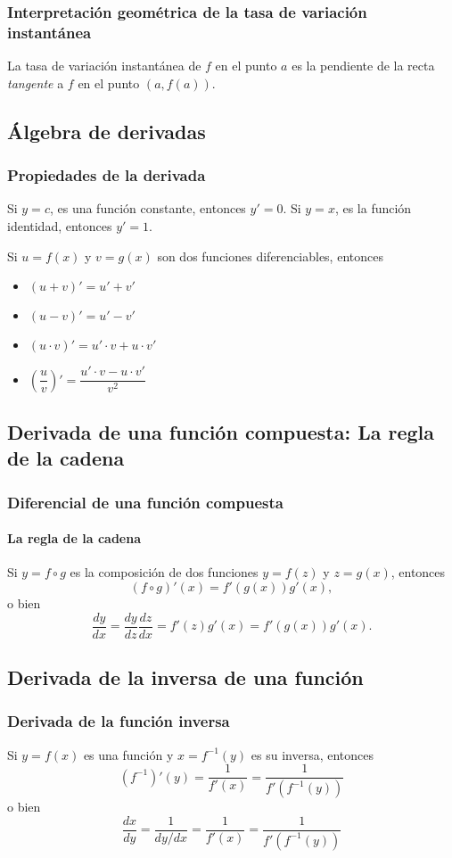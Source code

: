 \begin{frame}
\frametitle{Interpretación geométrica de la tasa de variación instantánea}
La tasa de variación instantánea de $f$ en el punto $a$ es la pendiente de la recta \emph{tangente} a $f$ en el punto $(a,f(a))$.
\begin{center}
\scalebox{1}{}
\end{center}
\end{frame}



\subsection{Álgebra de derivadas}
\begin{frame}
\frametitle{Propiedades de la derivada}
Si $y=c$, es una función constante, entonces $y'=0$.
Si $y=x$, es la función identidad, entonces  $y'=1$.

Si $u=f(x)$ y $v=g(x)$ son dos funciones diferenciables, entonces
\begin{itemize}
\item $(u+v)'=u'+v'$
\item $(u-v)'=u'-v'$
\item $(u\cdot v)'=u'\cdot v+ u\cdot v'$
\item $\left(\dfrac{u}{v}\right)'=\dfrac{u'\cdot v-u\cdot v'}{v^2}$
\end{itemize}
\end{frame}


\subsection{Derivada de una función compuesta: La regla de la cadena}

\begin{frame}
\frametitle{Diferencial de una función compuesta}
\framesubtitle{La regla de la cadena}
Si $y=f\circ g$ es la composición de dos funciones $y=f(z)$ y $z=g(x)$, entonces
\[
(f\circ g)'(x)=f'(g(x))g'(x),
\]
o bien
\[
\frac{dy}{dx}=\frac{dy}{dz}\frac{dz}{dx}=f'(z)g'(x)=f'(g(x))g'(x).
\]
\end{frame}



\subsection{Derivada de la inversa de una función}
\begin{frame}
\frametitle{Derivada de la función inversa}
Si $y=f(x)$ es una función y $x=f^{-1}(y)$ es su inversa, entonces
\[
\left(f^{-1}\right)'(y)=\frac{1}{f'(x)}=\frac{1}{f'(f^{-1}(y))}
\]
o bien
\[
\frac{dx}{dy}=\frac{1}{dy/dx}=\frac{1}{f'(x)}=\frac{1}{f'(f^{-1}(y))}
\]
\end{frame}



